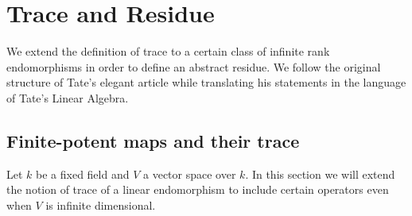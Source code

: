 \chapter{Trace and Residue}\label{ch:trace-and-residue}
We extend the definition of trace to a certain class of infinite rank endomorphisms in order to define an abstract residue. We follow the original structure of Tate's elegant article \cite{Tate} while translating his statements in the language of Tate's Linear Algebra.
\section{Finite-potent maps and their trace}
Let $k$ be a fixed field and $V$ a vector space over $k$. In this section we will extend the notion of trace of a linear endomorphism to include certain operators even when $V$ is infinite dimensional.
